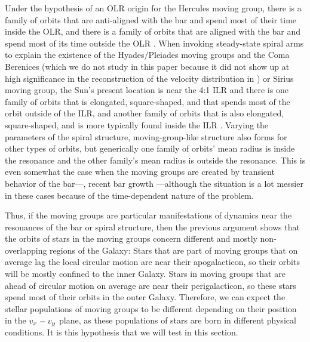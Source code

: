 Under the hypothesis of an OLR origin for the Hercules moving group,
there is a family of orbits that are anti-aligned with the bar and
spend most of their time inside the OLR, and there is a family of
orbits that are aligned with the bar and spend most of its time
outside the OLR \citep{Contopoulos89a}. When invoking steady-state
spiral arms to explain the existence of the Hyades/Pleiades moving
groups and the Coma Berenices (which we do not study in this paper
because it did not show up at high significance in the reconstruction
of the velocity distribution in \bhr) or Sirius moving group, the
Sun's present location is near the 4:1 ILR and there is one family of
orbits that is elongated, square-shaped, and that spends most of the
orbit outside of the ILR, and another family of orbits that is also
elongated, square-shaped, and is more typically found inside the ILR
\citep{Contopoulos86a}. Varying the parameters of the spiral
structure, moving-group-like structure also forms for other types of
orbits, but generically one family of orbits' mean radius is inside
the resonance and the other family's mean radius is outside the
resonance. This is even somewhat the case when the moving groups are
created by transient behavior of the bar---\eg, recent bar growth
\citep{Minchev09a}---although the situation is a lot messier in these
cases because of the time-dependent nature of the problem.


Thus, if the moving groups are particular manifestations of dynamics
near the resonances of the bar or spiral structure, then the previous
argument shows that the orbits of stars in the moving groups concern
different and mostly non-overlapping regions of the Galaxy: Stars that
are part of moving groups that on average lag the local circular
motion are near their apogalacticon, so their orbits will be mostly
confined to the inner Galaxy. Stars in moving groups that are ahead of
circular motion on average are near their perigalacticon, so these
stars spend most of their orbits in the outer Galaxy. Therefore, we
can expect the stellar populations of moving groups to be different
depending on their position in the $v_x-v_y$ plane, as these
populations of stars are born in different physical conditions. It is
this hypothesis that we will test in this section.


